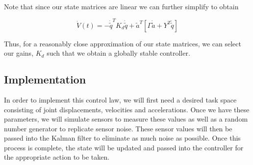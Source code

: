 Note that since our state matrices are linear we can further simplify to obtain

\begin{equation}
  \dot{V}(t) = -\dot{\tilde{q}}^{T}K_{d}\dot{\tilde{q}} + \tilde{a}^{T}\left[\Gamma\dot{\tilde{a}} + Y^{T}\dot{\tilde{q}} \right]
\end{equation}

Thus, for a reasonably close approximation of our state matrices, we can select
our gains, $K_{d}$ such that we obtain a globally stable controller.

\subsection{Implementation}
In order to implement this control law, we will first need a desired task space
consisting of joint displacements, velocities and accelerations.
Once we have these parameters, we will simulate sensors to measure these values
as well as a random number generator to replicate sensor noise.
These sensor values will then be passed into the Kalman filter to eliminate as
much noise as possible.
Once this process is complete, the state will be updated and passed into the
controller for the appropriate action to be taken.
